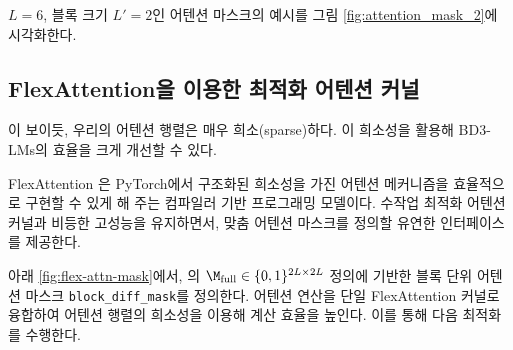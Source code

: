 \documentclass{article} %
\def\algos{BD3-LMs}
\begin{document}
$L = 6$, 블록 크기 $L' = 2$인 어텐션 마스크의 예시를 그림 \ref{fig:attention_mask_2}에 시각화한다.




% 
% 


\subsection{FlexAttention을 이용한 최적화 어텐션 커널}\label{suppl:flex-attention-kernels}

이 보이듯, 우리의 어텐션 행렬은 매우 희소(sparse)하다. 이 희소성을 활용해 \algos{}의 효율을 크게 개선할 수 있다.

FlexAttention \citep{dong2024flex}은 PyTorch에서 구조화된 희소성을 가진 어텐션 메커니즘을 효율적으로 구현할 수 있게 해 주는 컴파일러 기반 프로그래밍 모델이다. 수작업 최적화 어텐션 커널과 비등한 고성능을 유지하면서, 맞춤 어텐션 마스크를 정의할 유연한 인터페이스를 제공한다.

아래 \cref{fig:flex-attn-mask}에서, 의 $\M_{\text{full}} \in \{0, 1\}^{2L \times 2L}$ 정의에 기반한 블록 단위 어텐션 마스크 \texttt{block\_diff\_mask}를 정의한다. 어텐션 연산을 단일 FlexAttention 커널로 융합하여 어텐션 행렬의 희소성을 이용해 계산 효율을 높인다. 이를 통해 다음 최적화를 수행한다.
\end{document}
